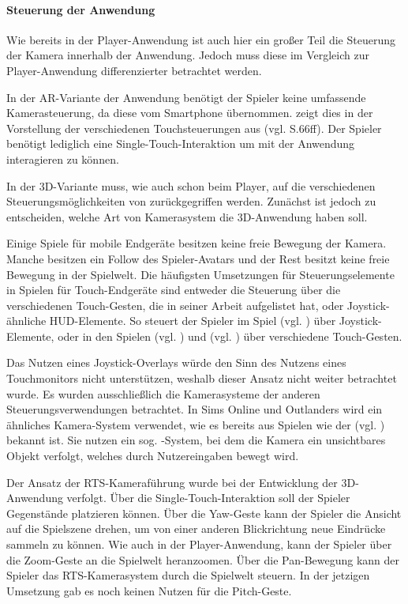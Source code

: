 \paragraph{Steuerung der Anwendung}
Wie bereits in der Player-Anwendung ist auch hier ein großer Teil die Steuerung der Kamera innerhalb der Anwendung. Jedoch muss diese im Vergleich zur Player-Anwendung differenzierter betrachtet werden. 

In der \ac{AR}-Variante der Anwendung benötigt der Spieler keine umfassende Kamerasteuerung, da diese vom Smartphone  übernommen. \cite{reinhard_augmented_2022} zeigt dies in der Vorstellung der verschiedenen Touchsteuerungen aus (vgl. S.66ff). Der Spieler benötigt lediglich eine Single-Touch-Interaktion um mit der Anwendung interagieren zu können.

In der \ac{3D}-Variante muss, wie auch schon beim Player, auf die verschiedenen Steuerungsmöglichkeiten von \cite{reinhard_augmented_2022} zurückgegriffen werden. Zunächst ist jedoch zu entscheiden, welche Art von Kamerasystem die \ac{3D}-Anwendung haben soll. 

Einige Spiele für mobile Endgeräte besitzen keine freie Bewegung der Kamera. Manche besitzen ein Follow des Spieler-Avatars und der Rest besitzt keine freie Bewegung in der Spielwelt. Die häufigsten Umsetzungen für Steuerungselemente in Spielen für Touch-Endgeräte sind entweder die Steuerung über die verschiedenen Touch-Gesten, die \cite{reinhard_augmented_2022} in seiner Arbeit aufgelistet hat, oder Joystick-ähnliche \ac{HUD}-Elemente. 
So steuert der Spieler im Spiel  (vgl. \cite{noauthor_botworld_nodate}) über Joystick-Elemente, oder in den Spielen  (vgl. \cite{arts_sims_2017}) und  (vgl. \cite{noauthor_outlanders_2025}) über verschiedene Touch-Gesten. 

Das Nutzen eines Joystick-Overlays würde den Sinn des Nutzens eines Touchmonitors nicht unterstützen, weshalb dieser Ansatz nicht weiter betrachtet wurde. Es wurden ausschließlich die Kamerasysteme der anderen Steuerungsverwendungen betrachtet. In Sims Online und Outlanders wird ein ähnliches Kamera-System verwendet, wie es bereits aus Spielen wie der  (vgl. \cite{noauthor_ubisoft_nodate}) bekannt ist. Sie nutzen ein sog. -System, bei dem die Kamera ein unsichtbares Objekt verfolgt, welches durch Nutzereingaben bewegt wird.

Der Ansatz der \ac{RTS}-Kameraführung wurde bei der Entwicklung der \ac{3D}-Anwendung verfolgt. Über die Single-Touch-Interaktion soll der Spieler Gegenstände platzieren können. Über die Yaw-Geste kann der Spieler die Ansicht auf die Spielszene drehen, um von einer anderen Blickrichtung neue Eindrücke sammeln zu können. Wie auch in der Player-Anwendung, kann der Spieler über die Zoom-Geste an die Spielwelt heranzoomen. Über die Pan-Bewegung kann der Spieler das \ac{RTS}-Kamerasystem durch die Spielwelt steuern. In der jetzigen Umsetzung gab es noch keinen Nutzen für die Pitch-Geste.

